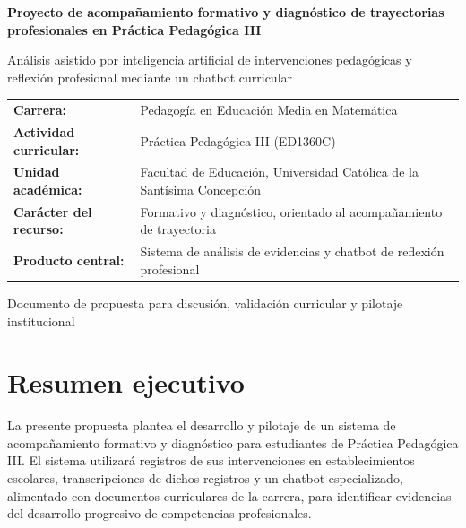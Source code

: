 \documentclass[11pt,a4paper]{article}
\begin{document}
\begin{titlepage}
    \centering
    \vspace*{1.7cm}

    {\Large\bfseries\color{ucscblue}
    Proyecto de acompañamiento formativo y diagnóstico de trayectorias profesionales en Práctica Pedagógica III\par}

    \vspace{0.6cm}

    {\large
    Análisis asistido por inteligencia artificial de intervenciones pedagógicas y reflexión profesional mediante un chatbot curricular\par}

    \vspace{1.5cm}

    \begin{tabular}{>{\bfseries}p{4.2cm}p{9.2cm}}
        Carrera: & Pedagogía en Educación Media en Matemática\\[0.2cm]
        Actividad curricular: & Práctica Pedagógica III (ED1360C)\\[0.2cm]
        Unidad académica: & Facultad de Educación, Universidad Católica de la Santísima Concepción\\[0.2cm]
        Carácter del recurso: & Formativo y diagnóstico, orientado al acompañamiento de trayectoria\\[0.2cm]
        Producto central: & Sistema de análisis de evidencias y chatbot de reflexión profesional\\
    \end{tabular}

    \vfill

    {\small Documento de propuesta para discusión, validación curricular y pilotaje institucional\par}
\end{titlepage}

\tableofcontents
\newpage

\section{Resumen ejecutivo}

La presente propuesta plantea el desarrollo y pilotaje de un sistema de acompañamiento formativo y diagnóstico para estudiantes de Práctica Pedagógica III. El sistema utilizará registros de sus intervenciones en establecimientos escolares, transcripciones de dichos registros y un chatbot especializado, alimentado con documentos curriculares de la carrera, para identificar evidencias del desarrollo progresivo de competencias profesionales.
\end{document}
